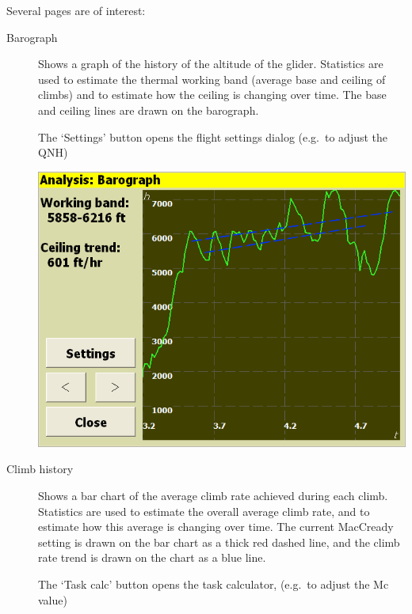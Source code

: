 \documentclass[a4paper,12pt]{refrep}
\begin{document}
Several pages are of interest:
\begin{description}
\item[Barograph]  Shows a graph of the history of the altitude of the glider.
  Statistics are used to estimate the thermal working band (average
  base and ceiling of climbs) and to estimate how the ceiling is
  changing over time.  The base and ceiling lines are drawn on the
  barograph.

  The `Settings' button opens the flight settings dialog
  (e.g.\ to adjust the QNH)

\begin{center}
\includegraphics[angle=0,width=\linewidth,keepaspectratio='true']{figures/analysis-barograph.png}
\end{center}

\item[Climb history]
  Shows a bar chart of the average climb rate achieved during each
  climb.  Statistics are used to estimate the overall average climb
  rate, and to estimate how this average is changing over time.  The
  current MacCready setting is drawn on the bar chart as a thick red
  dashed line, and the climb rate trend is drawn on the chart as a
  blue line.

  The `Task calc' button opens the task calculator,
  (e.g.\ to adjust the Mc value)


\end{description}
\end{document}
